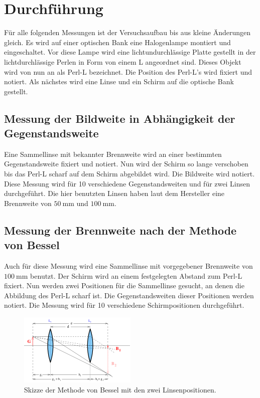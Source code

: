 \section{Durchführung}
\label{sec:Durchführung}

Für alle folgenden Messungen ist der Versuchsaufbau bis aus kleine Änderungen gleich.
Es wird auf einer optischen Bank eine Halogenlampe montiert und eingeschaltet.
Vor diese Lampe wird eine lichtundurchlässige Platte gestellt in der lichtdurchlässige Perlen in Form von einem L angeordnet sind.
Dieses Objekt wird von nun an als Perl-L bezeichnet.
Die Position des Perl-L's wird fixiert und notiert.
Als nächstes wird eine Linse und ein Schirm auf die optische Bank gestellt.

\subsection{Messung der Bildweite in Abhängigkeit der Gegenstandsweite}
\label{ssec:Durchführung_brennweite}

Eine Sammellinse mit bekannter Brennweite wird an einer bestimmten Gegenstandsweite fixiert und notiert.
Nun wird der Schirm so lange verschoben bis das Perl-L scharf auf dem Schirm abgebildet wird.
Die Bildweite wird notiert.
Diese Messung wird für 10 verschiedene Gegenstandsweiten und für zwei Linsen durchgeführt.
Die hier benutzten Linsen haben laut dem Hersteller eine Brennweite von $\SI{50}{\milli\metre}$ und $\SI{100}{\milli\metre}$.

\subsection{Messung der Brennweite nach der Methode von Bessel}
\label{ssec:Durchführung_bessel}

Auch für diese Messung wird eine Sammellinse mit vorgegebener Brennweite von $\SI{100}{\milli\metre}$ benutzt.
Der Schirm wird an einem festgelegten Abstand zum Perl-L fixiert.
Nun werden zwei Positionen für die Sammellinse gesucht, an denen die Abbildung des Perl-L scharf ist.
Die Gegenstandsweiten dieser Positionen werden notiert.
Die Messung wird für 10 verschiedene Schirmpositionen durchgeführt.

\begin{figure}
    \centering
    \includegraphics[width=0.5\textwidth]{images/skizze_bessel.png}
    \caption{Skizze der Methode von Bessel mit den zwei Linsenpositionen.\cite{V408}}
    \label{fig:skizze_bessel}
\end{figure}

